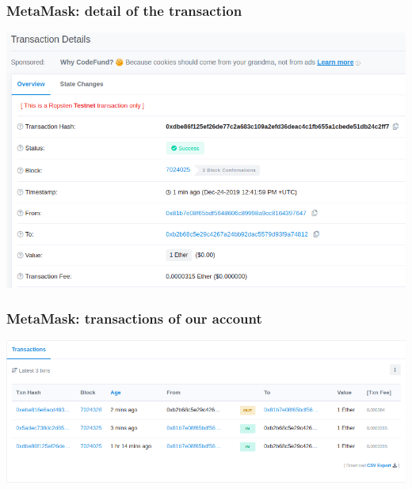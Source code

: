 \documentclass[11pt]{beamer}  %
\begin{document}
\begin{frame}\frametitle{MetaMask: detail of the transaction}

  \begin{center}
    \includegraphics[scale=0.4,clip=false]{pictures/metamask-faucet-transaction-details.png}
  \end{center}

\end{frame}

\begin{frame}\frametitle{MetaMask: transactions of our account}

  \begin{center}
    \includegraphics[width=\textwidth,clip=false]{pictures/metamask-faucet-transactions.png}
  \end{center}

\end{frame}
\end{document}
